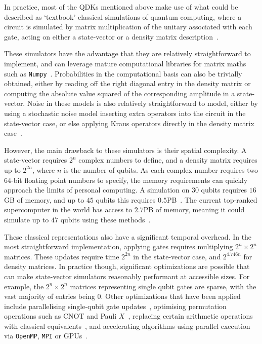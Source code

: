 In practice, most of the QDKs mentioned above make use of what could be described as `textbook' classical simulations of quantum computing, where a circuit is simulated by matrix multiplication of the unitary associated with each gate, acting on either a state-vector or a density matrix description~\cite{Nielsen2000}.\par
These simulators have the advantage that they are relatively straightforward to implement, and can leverage mature computational libraries for matrix maths such as \texttt{Numpy}~\cite{Numpy}. Probabilities in the computational basis can also be trivially obtained, either by reading off the right diagonal entry in the density matrix or computing the absolute value squared of the corresponding amplitude in a state-vector. Noise in these models is also relatively straightforward to model, either by using a stochastic noise model inserting extra operators into the circuit in the state-vector case, or else applying Kraus operators directly in the density matrix case~\cite{Nielsen2000}.\par
However, the main drawback to these simulators is their spatial complexity. A state-vector requires $2^{n}$ complex numbers to define, and a density matrix requires up to $2^{2n}$, where $n$ is the number of qubits. As each complex number requires two $64$-bit floating point numbers to specify, the memory requirements can quickly approach the limits of personal computing. A simulation on $30$ qubits requires $16$GB of memory, and up to $45$ qubits this requires $0.5$PB~\cite{Haner2016}. The current top-ranked supercomputer in the world has access to $2.7$PB of memory, meaning it could simulate up to $47$ qubits using these methods~\cite{Top500}.\par
These classical representations also have a significant temporal overhead. In the most straightforward implementation, applying gates requires multiplying $2^{n}\times 2^{n}$ matrices. These updates require time $2^{2n}$ in the state-vector case, and $2^{4.746n}$ for density matrices. In practice though, significant optimizations are possible that can make state-vector simulators reasonably performant at accessible sizes. For example, the $2^{n}\times 2^{n}$ matrices representing single qubit gates are sparse, with the vast  majority of entries being $0$. Other optimizations that have been applied include parallelising single-qubit gate updates~\cite{Smelyanskiy2016,Khammassi2017,Smelyanskiy2016,QiskitAer}, optimising permutation operations such as CNOT and Pauli $X$~\cite{Khammassi2017}, replacing certain arithmetic operations with classical equivalents~\cite{Haner2016}, and accelerating algorithms using parallel execution via \texttt{OpenMP}, \texttt{MPI} or GPUs~\cite{Jones2018,Smelyanskiy2016,Khammassi2017,QiskitAer}.\par

